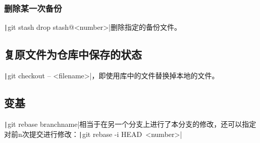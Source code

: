 \documentclass[fontset=ubuntu]{ctexart}
\begin{document}
\subsubsection{删除某一次备份}
\texttt|git stash drop stash@{<number>}|删除指定的备份文件。

\subsection{复原文件为仓库中保存的状态}
\texttt|git checkout -- <filename>|，即使用库中的文件替换掉本地的文件。

\subsection{变基}
\texttt|git rebase {branchname}|相当于在另一个分支上进行了本分支的修改，还可以指定对前n次提交进行修改：\texttt|git rebase -i HEAD~{<number>}|
\end{document}
